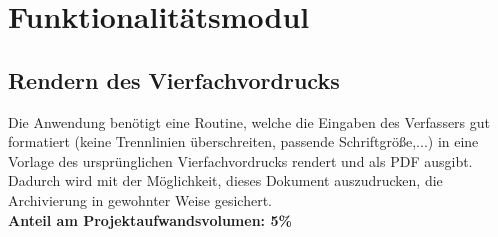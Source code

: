 \section{Funktionalitätsmodul}
\subsection{Rendern des Vierfachvordrucks}
Die Anwendung benötigt eine Routine, welche die Eingaben des Verfassers gut formatiert (keine Trennlinien überschreiten, passende Schriftgröße,...) in eine Vorlage des ursprünglichen Vierfachvordrucks rendert und als PDF ausgibt. Dadurch wird mit der Möglichkeit, dieses Dokument auszudrucken, die Archivierung in gewohnter Weise gesichert.\\
\textbf{Anteil am Projektaufwandsvolumen: 5\%}